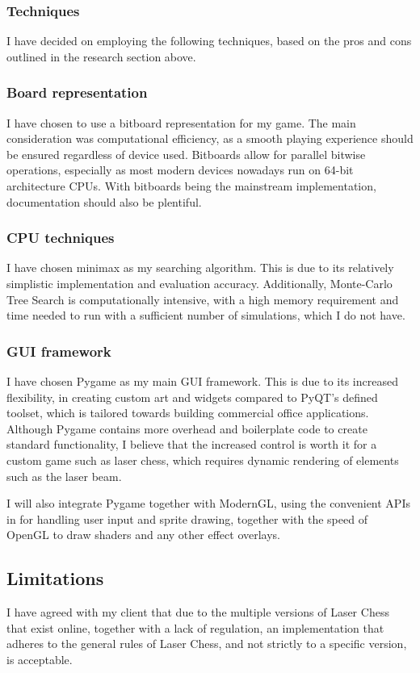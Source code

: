 \documentclass[../main/main.tex]{subfiles}
\begin{document}
\subsubsection{Techniques}
I have decided on employing the following techniques, based on the pros and cons outlined in the research section above.

\subsubsection*{Board representation}
I have chosen to use a bitboard representation for my game. The main consideration was computational efficiency, as a smooth playing experience should be ensured regardless of device used. Bitboards allow for parallel bitwise operations, especially as most modern devices nowadays run on 64-bit architecture CPUs. With bitboards being the mainstream implementation, documentation should also be plentiful.

\subsubsection*{CPU techniques}
I have chosen minimax as my searching algorithm. This is due to its relatively simplistic implementation and evaluation accuracy. Additionally, Monte-Carlo Tree Search is computationally intensive, with a high memory requirement and time needed to run with a sufficient number of simulations, which I do not have. 

\subsubsection*{GUI framework}
I have chosen Pygame as my main GUI framework. This is due to its increased flexibility, in creating custom art and widgets compared to PyQT’s defined toolset, which is tailored towards building commercial office applications. Although Pygame contains more overhead and boilerplate code to create standard functionality, I believe that the increased control is worth it for a custom game such as laser chess, which requires dynamic rendering of elements such as the laser beam.

I will also integrate Pygame together with ModernGL, using the convenient APIs in for handling user input and sprite drawing, together with the speed of OpenGL to draw shaders and any other effect overlays.

\subsection{Limitations}
I have agreed with my client that due to the multiple versions of Laser Chess that exist online, together with a lack of regulation, an implementation that adheres to the general rules of Laser Chess, and not strictly to a specific version, is acceptable.
\end{document}
